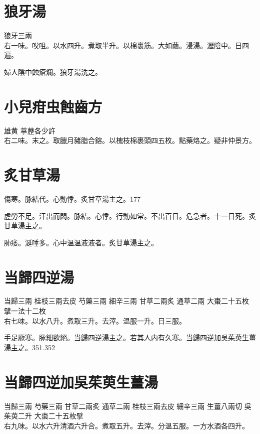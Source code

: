 \section{狼牙湯}

狼牙{\scriptsize 三兩}\\
右一味。㕮咀。以水四升。煮取半升。以棉裹筋。大如繭。浸湯。瀝陰中。日四遍。

{\khaaitp 婦人}陰中蝕瘡爛。狼牙湯洗之。

\section{小兒疳虫蝕齒方}

雄黄{ }葶藶{\scriptsize 各少許}\\
右二味。末之。取臘月豬脂合鎔。以槐枝棉裹頭四五枚。點藥烙之。{\scriptsize 疑非仲景方。}

\section{炙甘草湯}

傷寒。脉結代。心動悸。炙甘草湯主之。177

虗勞不足。汗出而悶。脉結。心悸。行動如常。不出百日。危急者。十一日死。炙甘草湯主之。

肺痿。涎唾多。心中温温液液者。炙甘草湯主之。

\section{当歸四逆湯}

当歸{\scriptsize 三兩} 桂枝{\scriptsize 三兩去皮} 芍藥{\scriptsize 三兩} 細辛{\scriptsize 三兩} 甘草{\scriptsize 二兩炙} 通草{\scriptsize 二兩} 大棗{\scriptsize 二十五枚擘一法十二枚}\\
右七味。以水八升。煮取三升。去滓。温服一升。日三服。

手足厥寒。脉細欲絕。当歸四逆湯主之。若其人内有久寒。当歸四逆加吳茱萸生薑湯主之。351.352

\section{当歸四逆加吳茱萸生薑湯}

当歸{\scriptsize 三兩} 芍藥{\scriptsize 三兩} 甘草{\scriptsize 二兩炙} 通草{\scriptsize 二兩} 桂枝{\scriptsize 三兩去皮} 細辛{\scriptsize 三兩} 生薑{\scriptsize 八兩切} 吳茱萸{\scriptsize 二升} 大棗{\scriptsize 二十五枚擘}\\
右九味。以水六升清酒六升合。煮取五升。去滓。分温五服。{\scriptsize 一方水酒各四升。}

